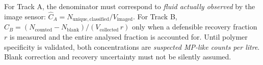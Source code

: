 \documentclass[10pt,a4paper]{article}
\begin{document}

For Track A, the denominator must correspond to \emph{fluid actually observed} by the image sensor: $\widehat{C}_{A}=N_{\mathrm{unique,classified}}/V_{\mathrm{imaged}}$. For Track B, $\widehat{C}_{B}=(N_{\mathrm{counted}}-N_{\mathrm{blank}})/(V_{\mathrm{collected}}\,r)$ only when a defensible recovery fraction $r$ is measured and the entire analysed fraction is accounted for. Until polymer specificity is validated, both concentrations are \emph{suspected MP-like counts per litre}. Blank correction and recovery uncertainty must not be silently assumed.
\end{document}
